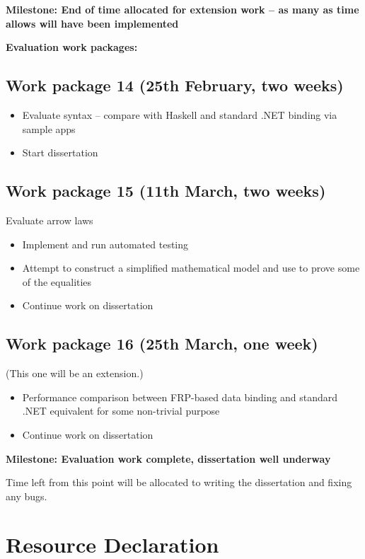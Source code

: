 	\noindent \textbf{Milestone: End of time allocated for extension work -- as many as time allows will have been implemented}
	
	\noindent \textbf{Evaluation work packages:}
	
	\subsection*{Work package 14 (25th February, two weeks)}
		\begin{itemize}
			\item Evaluate syntax -- compare with Haskell and standard .NET binding via sample apps
			\item Start dissertation
		\end{itemize}
	
		
	\subsection*{Work package 15 (11th March, two weeks)}
		Evaluate arrow laws
		\begin{itemize}
			\item Implement and run automated testing
			\item Attempt to construct a simplified mathematical model and use to prove some of the equalities
			\item Continue work on dissertation
		\end{itemize}

	
	\subsection*{Work package 16 (25th March, one week)}
		(This one will be an extension.)
		\begin{itemize}
			\item Performance comparison between FRP-based data binding and standard .NET equivalent for some non-trivial purpose
			\item Continue work on dissertation
		\end{itemize}
	
	\noindent \textbf{Milestone: Evaluation work complete, dissertation well underway}
	
	\noindent Time left from this point will be allocated to writing the dissertation and fixing any bugs.

\section*{Resource Declaration}

